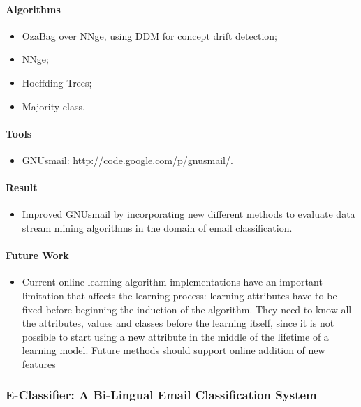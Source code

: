 \documentclass[12pt]{article}
\begin{document}
\paragraph{Algorithms}
\begin{itemize}
    \item OzaBag over NNge, using DDM for concept drift detection;
    \item NNge;
    \item Hoeffding Trees;
    \item Majority class.
\end{itemize}

\paragraph{Tools}
\begin{itemize}
    \item GNUsmail: http://code.google.com/p/gnusmail/.
\end{itemize}

\paragraph{Result}
\begin{itemize}
  \item Improved GNUsmail by incorporating new different methods to evaluate 
	data stream mining algorithms in the domain of email classification.
\end{itemize}

\paragraph{Future Work}
\begin{itemize}
  \item Current online learning algorithm implementations have an important 
	limitation that affects the learning process: learning attributes have 
	to be fixed before beginning the induction of the algorithm. They need 
	to know all the attributes, values and classes before the learning itself, 
	since it is not possible to start using a new attribute in the middle of the 
	lifetime of a learning model. Future methods should support online addition of
	new features
\end{itemize}


\subsubsection{E-Classifier: A Bi-Lingual Email Classification System \cite{NOUF08}}
\end{document}
